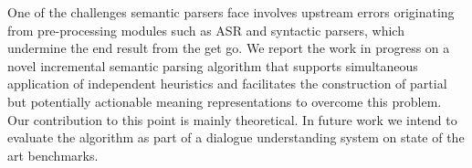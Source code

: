 One of the challenges semantic parsers face involves upstream errors originating from pre-processing modules such as ASR and syntactic parsers, which undermine the end result from the get go. We report the work in progress on a novel incremental semantic parsing algorithm that supports simultaneous application of independent heuristics and facilitates the construction of partial but potentially actionable meaning representations to overcome this problem. Our contribution to this point is mainly theoretical. In future work we intend to evaluate the algorithm as part of a dialogue understanding system on state of the art benchmarks.
